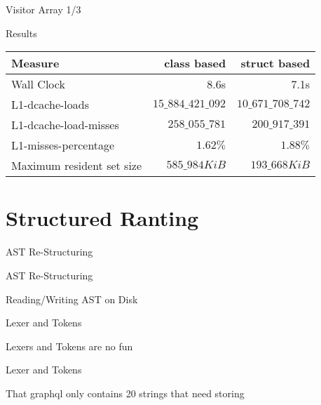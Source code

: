 \documentclass[aspectratio=169,notes]{beamer}
\begin{document}
	\begin{frame}[fragile]{Visitor Array 1/3}
		
	\end{frame}

	\begin{frame}[fragile]{Results}
		\centering
		\begin{tabular}{l r r}
			Measure & class based & struct based \\ \hline
			Wall Clock & 8.6s & 7.1s \\
			L1-dcache-loads & $15\_884\_421\_092$ & $10\_671\_708\_742$ \\
			L1-dcache-load-misses & $258\_055\_781$ & $200\_917\_391$ \\
			L1-misses-percentage & $1.62\%$ & $1.88\%$ \\
			Maximum resident set size & $585\_984 KiB$ & $193\_668 KiB$
		\end{tabular}
	\end{frame}

	\section{Structured Ranting}

	\begin{frame}[fragile]{AST Re-Structuring}
		
	\end{frame}

	\begin{frame}[fragile]{AST Re-Structuring}
		
	\end{frame}

	\begin{frame}[fragile]{Reading/Writing AST on Disk}

	\end{frame}

	\begin{frame}[fragile]{Lexer and Tokens}
		\begin{center}
		\large
		Lexers and Tokens are no fun
		\end{center}
	\end{frame}

	\begin{frame}[fragile]{Lexer and Tokens}
		

		That graphql only contains 20 strings that need storing
	\end{frame}
\end{document}
